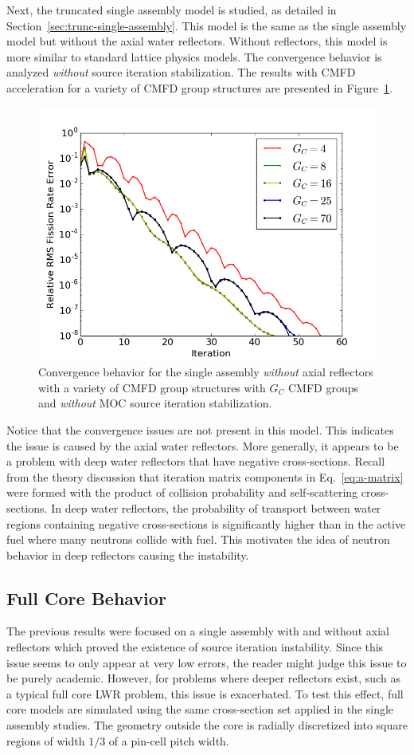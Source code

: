 Next, the truncated single assembly model is studied, as detailed in Section~\ref{sec:trunc-single-assembly}. This model is the same as the single assembly model but without the axial water reflectors. Without reflectors, this model is more similar to standard lattice physics models. The convergence behavior is analyzed \textit{without} source iteration stabilization. The results with \ac{CMFD} acceleration for a variety of \ac{CMFD} group structures are presented in Figure~\ref{fig:truncated-convergence}.
\begin{figure}[ht!]
	\centering
	\includegraphics[width=0.65\linewidth]{figures/convergence/sa_trunc_no_stab.png}
	\caption{Convergence behavior for the single assembly \textit{without} axial reflectors with a variety of \ac{CMFD} group structures with $G_C$ \ac{CMFD} groups and \textit{without} \ac{MOC} source iteration stabilization.}
	\label{fig:truncated-convergence}
\end{figure}
Notice that the convergence issues are not present in this model. This indicates the issue is caused by the axial water reflectors. More generally, it appears to be a problem with deep water reflectors that have negative cross-sections. Recall from the theory discussion that iteration matrix components in Eq.~\ref{eq:a-matrix} were formed with the product of collision probability and self-scattering cross-sections. In deep water reflectors, the probability of transport between water regions containing negative cross-sections is significantly higher than in the active fuel where many neutrons collide with fuel. This motivates the idea of neutron behavior in deep reflectors causing the instability. 

\subsection{Full Core Behavior}

The previous results were focused on a single assembly with and without axial reflectors which proved the existence of source iteration instability. Since this issue seems to only appear at very low errors, the reader might judge this issue to be purely academic. However, for problems where deeper reflectors exist, such as a typical full core \ac{LWR} problem, this issue is exacerbated. To test this effect, full core models are simulated using the same cross-section set applied in the single assembly studies. The geometry outside the core is radially discretized into square regions of width $1/3$ of a pin-cell pitch width.

